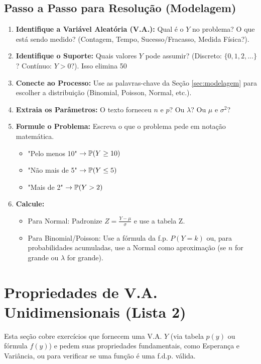 \subsection{Passo a Passo para Resolução (Modelagem)}
\begin{enumerate}
    \item \textbf{Identifique a Variável Aleatória (V.A.):} Qual é o $Y$ no problema? O que está sendo medido? (Contagem, Tempo, Sucesso/Fracasso, Medida Física?).
    \item \textbf{Identifique o Suporte:} Quais valores $Y$ pode assumir? (Discreto: $\{0, 1, 2, ...\}$? Contínuo: $Y > 0$?). Isso elimina 50%
    \item \textbf{Conecte ao Processo:} Use as palavras-chave da Seção \ref{sec:modelagem} para escolher a distribuição (Binomial, Poisson, Normal, etc.).
    \item \textbf{Extraia os Parâmetros:} O texto forneceu $n$ e $p$? Ou $\lambda$? Ou $\mu$ e $\sigma^2$?
    \item \textbf{Formule o Problema:} Escreva o que o problema pede em notação matemática.
    \begin{itemize}
        \item "Pelo menos 10" $\rightarrow \mathbb{P}(Y \ge 10)$
        \item "Não mais de 5" $\rightarrow \mathbb{P}(Y \le 5)$
        \item "Mais de 2" $\rightarrow \mathbb{P}(Y > 2)$
    \end{itemize}
    \item \textbf{Calcule:}
    \begin{itemize}
        \item Para Normal: Padronize $Z = \frac{Y - \mu}{\sigma}$ e use a tabela Z.
        \item Para Binomial/Poisson: Use a fórmula da f.p. $P(Y=k)$ ou, para probabilidades acumuladas, use a Normal como aproximação (se $n$ for grande ou $\lambda$ for grande).
    \end{itemize}
\end{enumerate}


\section{Propriedades de V.A. Unidimensionais (Lista 2)}
\label{sec:va_uni}
Esta seção cobre exercícios que fornecem uma V.A. $Y$ (via tabela $p(y)$ ou fórmula $f(y)$) e pedem suas propriedades fundamentais, como Esperança e Variância, ou para verificar se uma função é uma f.d.p. válida.

